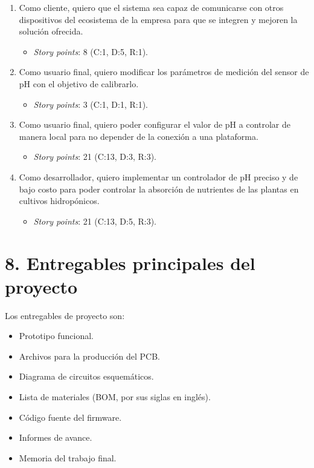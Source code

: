 \documentclass[
11pt, %
codirector, %
]{charter}
\begin{document}
\begin{enumerate}
	\item Como cliente, quiero que el sistema sea capaz de comunicarse con otros dispositivos del ecosistema de la empresa para que se integren y mejoren la solución ofrecida. 
	\begin{itemize}
		\item \textit{Story points}: 8 (C:1, D:5, R:1).	
	\end{itemize}
	
	\item Como usuario final, quiero modificar los parámetros de medición del sensor de pH con el objetivo de calibrarlo.
	\begin{itemize}
		\item \textit{Story points}: 3 (C:1, D:1, R:1).	
	\end{itemize}
	
	\item Como usuario final, quiero poder configurar el valor de pH a controlar de manera local para no depender de la conexión a una plataforma. 
	\begin{itemize}
		\item \textit{Story points}: 21 (C:13, D:3, R:3).	
	\end{itemize}
	
	\item Como desarrollador, quiero implementar un controlador de pH preciso y de bajo costo para poder controlar la absorción de nutrientes de las plantas en cultivos hidropónicos.
	\begin{itemize}
		\item \textit{Story points}: 21 (C:13, D:5, R:3).	
	\end{itemize}
\end{enumerate}

\section{8. Entregables principales del proyecto}
\label{sec:entregables}

Los entregables de proyecto son:

\begin{itemize}
	\item Prototipo funcional.
	\item Archivos para la producción del PCB.
	\item Diagrama de circuitos esquemáticos.
	\item Lista de materiales (BOM, por sus siglas en inglés).
	\item Código fuente del firmware.
	\item Informes de avance.
	\item Memoria del trabajo final.
\end{itemize}
\end{document}
